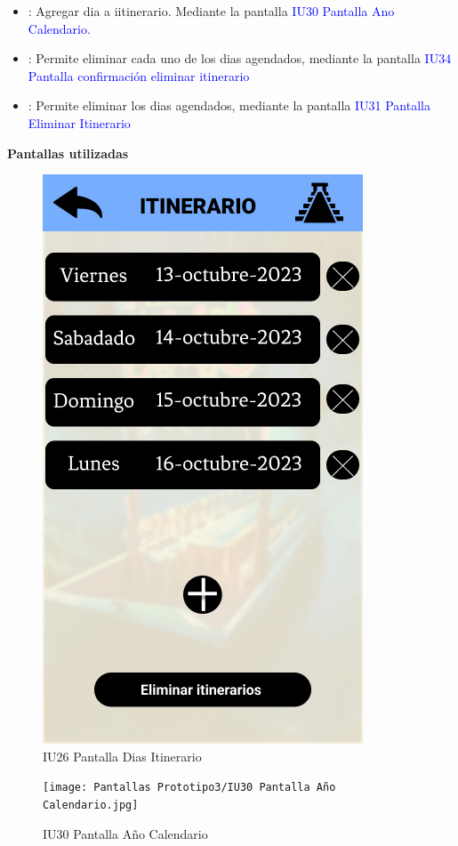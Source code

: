 \begin{itemize}
    \item \fbox{+}: Agregar dia a iitinerario. Mediante la pantalla \textcolor{blue}{ IU30 Pantalla Ano Calendario.}
    
    \item {}: Permite eliminar cada uno de los dias agendados, mediante la pantalla \textcolor{blue}{IU34 Pantalla confirmación eliminar itinerario}
    \item {}: Permite eliminar los dias agendados, mediante la pantalla \textcolor{blue}{ IU31 Pantalla Eliminar Itinerario}
\end{itemize}

\textbf{Pantallas utilizadas}
\begin{figure}[htb]
    \centering 
        \includegraphics[width=.5\linewidth]{Pantallas Prototipo3/IU26 Pantalla Dias Itinerario.jpg}
        \caption{IU26 Pantalla Dias Itinerario}
\end{figure}
\newpage
\begin{figure}[htb] 
        \centering
        \texttt{[image: Pantallas Prototipo3/IU30 Pantalla Año Calendario.jpg]}
        \caption{IU30 Pantalla Año Calendario}
\end{figure}
\newpage
